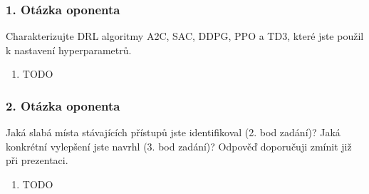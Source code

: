 \begin{frame}
    \frametitle{1. Otázka oponenta}
    \large{Charakterizujte DRL algoritmy A2C, SAC, DDPG, PPO a TD3, které jste použil k nastavení hyperparametrů.}

    \begin{enumerate}
        \item TODO
    \end{enumerate}
\end{frame}

\begin{frame}
    \frametitle{2. Otázka oponenta}
    \large{Jaká slabá místa stávajících přístupů jste identifikoval (2. bod zadání)? Jaká konkrétní vylepšení jste navrhl (3. bod zadání)? Odpověď doporučuji zmínit již při prezentaci.}

    \begin{enumerate}
        \item TODO
    \end{enumerate}
\end{frame}








